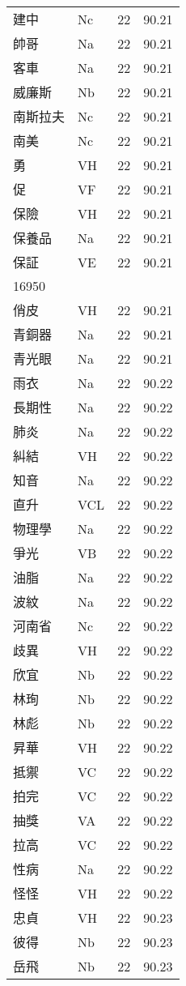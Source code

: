\documentclass[twocolumn]{book}
\begin{document}
\begin{supertabular}{llrr}
建中 & Nc & 22 &  90.21\\
帥哥 & Na & 22 &  90.21\\
客車 & Na & 22 &  90.21\\
威廉斯 & Nb & 22 &  90.21\\
南斯拉夫 & Nc & 22 &  90.21\\
南美 & Nc & 22 &  90.21\\
勇 & VH & 22 &  90.21\\
促 & VF & 22 &  90.21\\
保險 & VH & 22 &  90.21\\
保養品 & Na & 22 &  90.21\\
保証 & VE & 22 &  90.21\\
16950\\
俏皮 & VH & 22 &  90.21\\
青銅器 & Na & 22 &  90.21\\
青光眼 & Na & 22 &  90.21\\
雨衣 & Na & 22 &  90.22\\
長期性 & Na & 22 &  90.22\\
肺炎 & Na & 22 &  90.22\\
糾結 & VH & 22 &  90.22\\
知音 & Na & 22 &  90.22\\
直升 & VCL & 22 &  90.22\\
物理學 & Na & 22 &  90.22\\
爭光 & VB & 22 &  90.22\\
油脂 & Na & 22 &  90.22\\
波紋 & Na & 22 &  90.22\\
河南省 & Nc & 22 &  90.22\\
歧異 & VH & 22 &  90.22\\
欣宜 & Nb & 22 &  90.22\\
林珣 & Nb & 22 &  90.22\\
林彪 & Nb & 22 &  90.22\\
昇華 & VH & 22 &  90.22\\
抵禦 & VC & 22 &  90.22\\
拍完 & VC & 22 &  90.22\\
抽獎 & VA & 22 &  90.22\\
拉高 & VC & 22 &  90.22\\
性病 & Na & 22 &  90.22\\
怪怪 & VH & 22 &  90.22\\
忠貞 & VH & 22 &  90.23\\
彼得 & Nb & 22 &  90.23\\
岳飛 & Nb & 22 &  90.23\\

\end{supertabular}
\end{document}
